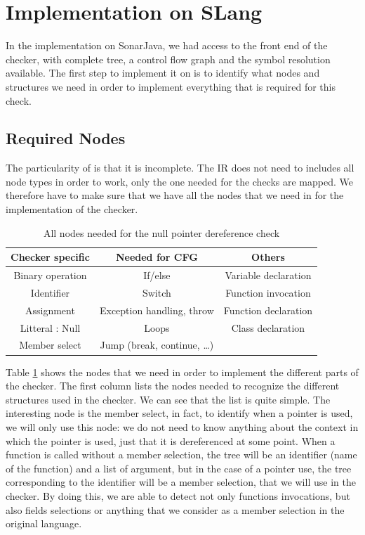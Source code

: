 \section{Implementation on SLang}
\label{sec:implementation_slang}

In the implementation on SonarJava, we had access to the front end of the checker, with complete tree, a control flow graph and the symbol resolution available.
The first step to implement it on \slang{} is to identify what nodes and structures we need in order to implement everything that is required for this check.

\subsection{Required Nodes}
\label{subsec:nodes}

The particularity of \slang{}  is that it is incomplete. 
The IR does not need to includes all node types in order to work, only the one needed for the checks are mapped. 
We therefore have to make sure that we have all the nodes that we need in \slang{} for the implementation of the checker.

\begin{table}[h]
	\caption{All nodes needed for the null pointer dereference check}
	\label{table:nodes-needed}
	\begin{tabular}{|c|c|c|}
		\hline
		\bf Checker specific & \bf Needed for CFG & \bf Others  \\ \hline
	    Binary operation & If/else & Variable declaration \\
		Identifier & Switch & Function invocation \\
		Assignment & Exception handling, throw  & Function declaration \\
		Litteral : Null & Loops & Class declaration \\
		Member select & Jump (break, continue, …) & \\ \hline
	\end{tabular}
\end{table}

Table \ref{table:nodes-needed} shows the nodes that we need in order to implement the different parts of the checker.
The first column lists the nodes needed to recognize the different structures used in the checker. 
We can see that the list is quite simple. 
The interesting node is the member select, in fact, to identify when a pointer is used, we will only use this node: we do not need to know anything about the context in which the pointer is used, just that it is dereferenced at some point.
When a function is called without a member selection, the tree will be an identifier (name of the function) and a list of argument, but in the case of a pointer use, the tree corresponding to the identifier will be a member selection, that we will use in the checker.
By doing this, we are able to detect not only functions invocations, but also fields selections or anything that we consider as a member selection in the original language.

